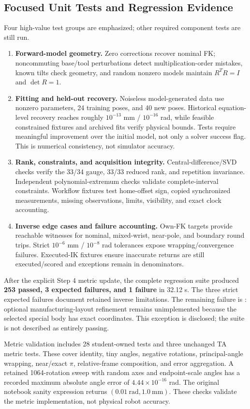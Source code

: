 \documentclass[11pt,letterpaper]{article}
\begin{document}
\subsection{Focused Unit Tests and Regression Evidence}
Four high-value test groups are emphasized; other required component tests are still run.
\begin{enumerate}[leftmargin=*,itemsep=2pt]
\item \textbf{Forward-model geometry.} Zero corrections recover nominal FK; noncommuting base/tool perturbations detect multiplication-order mistakes, known tilts check geometry, and random nonzero models maintain $R^TR=I$ and $\det R=1$.
\item \textbf{Fitting and held-out recovery.} Noiseless model-generated data use nonzero parameters, 24 training poses, and 40 new poses. Historical equation-level recovery reaches roughly $10^{-13}$ mm / $10^{-16}$ rad, while feasible constrained fixtures and archived fits verify physical bounds. Tests require meaningful improvement over the initial model, not only a solver success flag. This is numerical consistency, not simulator accuracy.
\item \textbf{Rank, constraints, and acquisition integrity.} Central-difference/SVD checks verify the 33/34 gauge, 33/33 reduced rank, and repetition invariance. Independent polynomial-extremum checks validate complete-interval constraints. Workflow fixtures test home-offset sign, copied synchronized measurements, missing observations, limits, visibility, and exact clock accounting.
\item \textbf{Inverse edge cases and failure accounting.} Own-FK targets provide reachable witnesses for nominal, mixed-wrist, near-pole, and boundary round trips. Strict $10^{-6}$ mm / $10^{-8}$ rad tolerances expose wrapping/convergence failures. Executed-IK fixtures ensure inaccurate returns are still executed/scored and exceptions remain in denominators.
\end{enumerate}
After the explicit Step 4 metric update, the complete regression suite produced \textbf{253 passed, 3 expected failures, and 1 failure} in 32.12 s. The three strict expected failures document retained inverse limitations. The remaining failure is : optional manufacturing-layout refinement remains unimplemented because the selected special body has exact coordinates. This exception is disclosed; the suite is not described as entirely passing.

Metric validation includes 28 student-owned tests and three unchanged TA metric tests. These cover identity, tiny angles, negative rotations, principal-angle wrapping, near/exact $\pi$, relative-frame composition, and error aggregation. A retained 1064-rotation sweep with random axes and endpoint-scale angles has a recorded maximum absolute angle error of $4.44\times10^{-16}$ rad. The original notebook sanity expression returns $(0.01~\mathrm{rad},1.0~\mathrm{mm})$. These checks validate the metric implementation, not physical robot accuracy.
\end{document}
